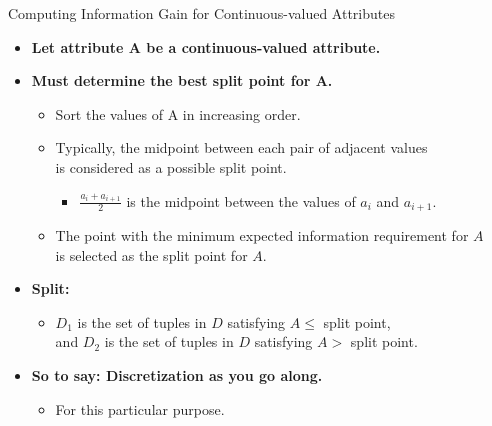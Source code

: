 \begin{frame}{Computing Information Gain for Continuous-valued Attributes}
  \begin{itemize}
  \item \textbf{Let attribute A be a continuous-valued attribute.}
  \item \textbf{Must determine the best split point for A.}
    \begin{itemize}
    \item Sort the values of A in increasing order.
    \item Typically, the midpoint between each pair of adjacent values \\ is considered as a possible split point.
      \begin{itemize}
      \item $\frac{a_i+a_{i+1}}{2}$ is the midpoint between the values of $a_i$ and $a_{i+1}$.
      \end{itemize}
    \item The point with the minimum expected information requirement for $A$ \\ is selected as the split point for $A$.
    \end{itemize}
  \item \textbf{Split:}
    \begin{itemize}
    \item $D_1$ is the set of tuples in $D$ satisfying $A \leq$ split point,\\
      and $D_2$ is the set of tuples in $D$ satisfying $A >$ split point.
    \end{itemize}
  \item \textbf{So to say: Discretization as you go along.}
    \begin{itemize}
    \item For this particular purpose.
    \end{itemize}
  \end{itemize}
\end{frame}

